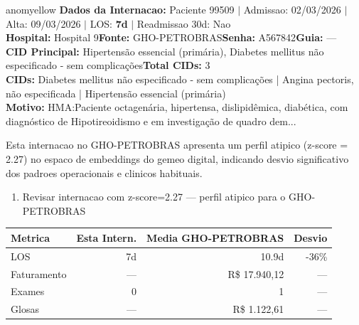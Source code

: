 \documentclass[a4paper,10pt]{article}
\begin{document}
\begin{anomalycard}[Internacao 167361 | GHO-PETROBRAS | MODERADO (z=2.27)]{anomyellow}
\textbf{Dados da Internacao:} Paciente 99509 $\mid$ Admissao: 02/03/2026 $\mid$ Alta: 09/03/2026 $\mid$ LOS: \textbf{7d} $\mid$ Readmissao 30d: Nao\\
\textbf{Hospital:} Hospital 9\quad\textbf{Fonte:} GHO-PETROBRAS\quad\textbf{Senha:} A567842\quad\textbf{Guia:} ---\\
\textbf{CID Principal:} {\small Hipertensão essencial (primária), Diabetes mellitus não especificado - sem complicações}\quad\textbf{Total CIDs:} 3\\

\textbf{CIDs:} {\scriptsize Diabetes mellitus não especificado - sem complicações | Angina pectoris, não especificada | Hipertensão essencial (primária)}\\

\textbf{Motivo:} {\scriptsize HMA:Paciente octagenária, hipertensa, dislipidêmica, diabética, com diagnóstico de Hipotireoidismo e em investigação de quadro dem...}\\

\vspace{2pt}\begin{tcolorbox}[colback=severityred!20,colframe=anomyellow,title={\textbf{Interpretacao de Negocio}},fonttitle=\bfseries\small,left=4pt,right=4pt,top=3pt,bottom=3pt]
{\small Esta internacao no GHO-PETROBRAS apresenta um perfil atipico (z-score = 2.27) no espaco de embeddings do gemeo digital, indicando desvio significativo dos padroes operacionais e clinicos habituais.}
\end{tcolorbox}
\begin{tcolorbox}[colback=severityyellow!30,colframe=anomorange,title={\textbf{Recomendacoes Especificas}},fonttitle=\bfseries\small,left=4pt,right=4pt,top=3pt,bottom=3pt]
\begin{enumerate}[nosep,leftmargin=16pt]
\item {\small Revisar internacao com z-score=2.27 --- perfil atipico para o GHO-PETROBRAS}
\end{enumerate}
\end{tcolorbox}
\begin{center}\begin{tabular}{l r r r}\toprule\textbf{Metrica} & \textbf{Esta Intern.} & \textbf{Media GHO-PETROBRAS} & \textbf{Desvio} \\\midrule
LOS & 7d & 10.9d & -36\% \\
Faturamento & --- & R\$ 17.940,12 & --- \\
Exames & 0 & 1 & --- \\
Glosas & --- & R\$ 1.122,61 & --- \\
\bottomrule\end{tabular}\end{center}


\end{anomalycard}
\end{document}
